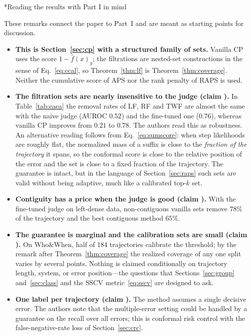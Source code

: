 \documentclass[11pt]{article}
\makeatletter
\theoremstyle{definition}
\renewcommand\subsection{\@startsection{subsection}{2}{\z@}{-3.25ex\@plus -1ex \@minus -.2ex}{1.5ex \@plus .2ex}{\normalfont\large\bfseries\color{secblue}}}
\newcommand{\fhat}{\hat{f}}
\makeatother
\begin{document}
\subsection*{Reading the results with Part I in mind}
\begin{oursbox}
These remarks connect the paper to Part~I and are meant as starting points for discussion.
\begin{itemize}[leftmargin=1.5em]
\item \textbf{This is Section~\ref{sec:cp} with a structured family of sets.} Vanilla CP uses the score $1-\fhat(x)_y$; the filtrations are nested-set constructions in the sense of Eq.~\eqref{eq:ccal}, so Theorem~\ref{thm:lf} is Theorem~\ref{thm:coverage}. Neither the cumulative score of APS nor the rank penalty of RAPS is used.
\item \textbf{The filtration sets are nearly insensitive to the judge (claim ).} In Table~\ref{tab:caea} the removal rates of LF, RF and TWF are almost the same with the naive judge (AUROC $0.52$) and the fine-tuned one ($0.76$), whereas vanilla CP improves from $0.21$ to $0.78$. The authors read this as robustness. An alternative reading follows from Eq.~\eqref{eq:sumscore}: when step likelihoods are roughly flat, the normalized mass of a suffix is close to the \emph{fraction of the trajectory} it spans, so the conformal score is close to the relative position of the error and the set is close to a fixed fraction of the trajectory. The guarantee is intact, but in the language of Section~\ref{sec:raps} such sets are valid without being adaptive, much like a calibrated top-$k$ set.
\item \textbf{Contiguity has a price when the judge is good (claim ).} With the fine-tuned judge on left-dense data, non-contiguous vanilla sets remove $78\%$ of the trajectory and the best contiguous method $65\%$.
\item \textbf{The guarantee is marginal and the calibration sets are small (claim ).} On Who\&When, half of 184 trajectories calibrate the threshold; by the remark after Theorem~\ref{thm:coverage} the realized coverage of any one split varies by several points. Nothing is claimed conditionally on trajectory length, system, or error position---the questions that Sections~\ref{sec:group} and~\ref{sec:class} and the SSCV metric~\eqref{eq:sscv} are designed to ask.
\item \textbf{One label per trajectory (claim ).} The method assumes a single decisive error. The authors note that the multiple-error setting could be handled by a guarantee on the recall over all errors; this is conformal risk control with the false-negative-rate loss of Section~\ref{sec:crc}.

\end{itemize}
\end{oursbox}
\end{document}
